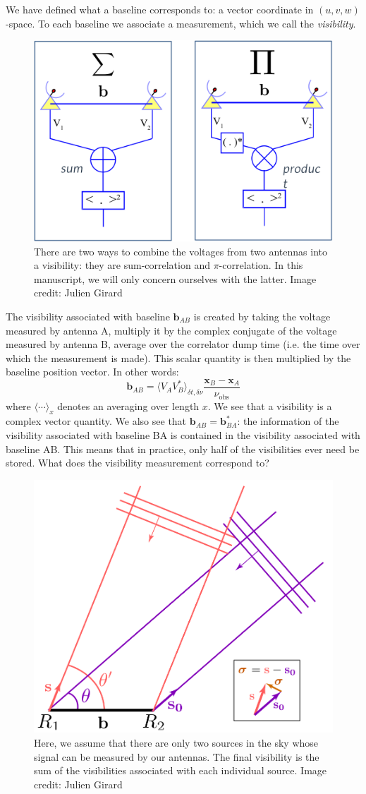 \pg
We have defined what a baseline corresponds to: a vector coordinate in $(u,v,w)$-space. To each baseline we associate a measurement, which we call the \emph{visibility}. 
\begin{figure}[ht]
\centering
\includegraphics[width=.7\textwidth]{images/visibility-creation.png}
\caption{\label{fig.visibility} There are two ways to combine the voltages from two antennas into a visibility: they are sum-correlation and $\pi$-correlation. In this manuscript, we will only concern ourselves with the latter. Image credit: Julien Girard}
\end{figure}
The visibility associated with baseline $\mathbf{b}_{AB}$ is created by taking the voltage measured by antenna A, multiply it by the complex conjugate of the voltage measured by antenna B, average over the correlator dump time (i.e. the time over which the measurement is made). This scalar quantity is then multiplied by the baseline position vector. In other words:
\begin{equation}
\mathbf{b}_{AB} = \langle V_{A} V_{B}^*\rangle_{\delta t, \delta \nu} \frac{\mathbf{x}_{B}-\mathbf{x}_{A}}{\nu_\mathrm{obs}}
\end{equation}
where $\langle \cdots \rangle_{x}$ denotes an averaging over length $x$. We see that a visibility is a complex vector quantity. We also see that $\mathbf{b}_{AB} = \mathbf{b}_{BA}^*$: the information of the visibility associated with baseline BA is contained in the visibility associated with baseline AB. This means that in practice, only half of the visibilities ever need be stored. What does the visibility measurement correspond to?
\begin{figure}[ht]
\centering
\includegraphics[width=.5\textwidth]{images/visibility-measure.png}
\caption{\label{fig.visibility.measure} Here, we assume that there are only two sources in the sky whose signal can be measured by our antennas. The final visibility is the sum of the visibilities associated with each individual source. Image credit: Julien Girard}
\end{figure}

